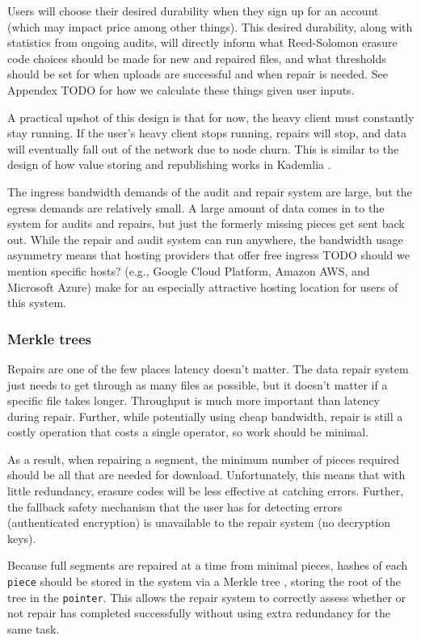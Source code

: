 \documentclass[a4paper,10pt]{article} \usepackage[utf8]{inputenc}
\newcommand{\x}[1]{{\tt #1}} \newcommand{\code}[1]{{\tt #1}}
\newcommand{\todo}[1]{{\color{red} TODO #1 }}
\begin{document}
Users will choose their desired durability when they sign up for an account
(which may impact price among other things). This desired durability, along with
statistics from ongoing audits, will directly inform what Reed-Solomon erasure
code choices should be made for new and repaired files, and what thresholds
should be set for when uploads are successful and when repair is needed. See
Appendex \todo{} for how we calculate these things given user inputs.

A practical upshot of this design is that for now, the heavy client must
constantly stay running. If the user's heavy client stops running, repairs will
stop, and data will eventually fall out of the network due to node churn. This
is similar to the design of how value storing and republishing works in
Kademlia \cite{kad}.

The ingress bandwidth demands of the audit and repair system are large, but the
egress demands are relatively small. A large amount of data comes in to the
system for audits and repairs, but just the formerly missing pieces get sent
back out.
While the repair and audit system can run anywhere, the bandwidth usage
asymmetry means that hosting providers
that offer free ingress \todo{should we mention specific hosts?
(e.g., Google Cloud Platform, Amazon AWS, and Microsoft Azure)}
make for an especially attractive hosting location for users of this system.

\subsubsection{Merkle trees}

Repairs are one of the few places latency doesn't matter. The data repair system
just needs to get through as many files as possible, but it doesn't matter if
a specific file takes longer. Throughput is much more important than
latency during repair. Further, while potentially using cheap bandwidth, repair
is still a costly operation that costs a single operator, so work should be
minimal.

As a result, when repairing a segment, the minimum number of pieces required
should be all that are needed for download. Unfortunately, this means that
with little redundancy, erasure codes will be less effective at catching errors.
Further, the fallback safety mechanism that the user has for detecting errors
(authenticated encryption) is unavailable to the repair system (no decryption
keys).

Because full segments are repaired at a time from minimal pieces, hashes of
each \x{piece} should be stored in the system via a Merkle tree
\cite{merkle-tree}, storing the root of the tree in the \x{pointer}. This allows
the repair system to correctly assess whether or not repair has completed
successfully without using extra redundancy for the same task.
\end{document}

